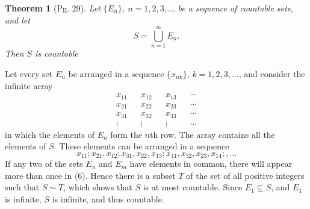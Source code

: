 \documentclass[leqno]{article}
\makeatletter
\newtheorem{theorem}{Theorem}[section]
\theoremstyle{definition}
\theoremstyle{remark}
\let\oldproofname=\proofname
\renewcommand{\proofname}{\bf{\textit{\oldproofname}}}
\renewenvironment{proof}[1][\proofname]{\par
  \pushQED{\qed}%
  \normalfont \topsep6\p@\@plus6\p@\relax
  \list{}{\leftmargin=0mm
          \rightmargin=0mm
          \settowidth{\itemindent}{\itshape#1}%
          \labelwidth=4mm
          \parsep=0pt \listparindent=0mm%
  }
  \item[\hskip\labelsep
        \itshape
    #1\@addpunct{.}]\ignorespaces
}{%
  \popQED\endlist\@endpefalse
}
\makeatother
\begin{document}
        \begin{theorem}[Pg. 29]\label{thm:4.2}
            Let $\{E_n\}$, $n=1,2,3,\dots$ be a sequence of countable sets, and let
                \begin{equation}
                    S=\bigcup_{n=1}^{\infty}E_n.
                \end{equation}
            Then $S$ is countable 
        \end{theorem}
            \begin{proof}
                Let every set $E_n$ be arranged in a sequence $\{x_{nk}\}$, $k=1,2,3,\dots$, and consider the infinite array
                    \begin{align*}
                        x_{11} & &x_{12} & &x_{13} & &\cdots \\
                        x_{21} & &x_{22} & &x_{23} & &\cdots \\
                        x_{31} & &x_{32} & &x_{33} & &\cdots \\
                        \vdots & &\vdots & &\vdots & &\cdots
                    \end{align*}
                in which the elements of $E_n$ form the $n$th row. The array contains all the elements of $S$. These elements can be arranged in a sequence
                    \begin{equation}
                        x_{11}; x_{21},x_{12}; x_{31},x_{22},x_{13};x_{41},x_{32},x_{23},x_{14};,\dots
                    \end{equation}
                If any two of the sets $E_n$ and $E_m$ have elements in common, there will appear more than once in (6). Hence there is a subset $T$ of the set of all positive integers such that $S\sim T$, which shows that $S$ is at most countable. Since $E_1\subseteq S$, and $E_1$ is infinite, $S$ is infinite, and thus countable.
            \end{proof}
\end{document}
